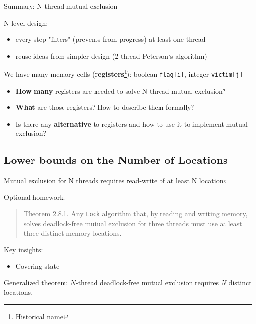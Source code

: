 \begin{frame}[fragile]{Summary: N-thread mutual exclusion}

N-level design:
\begin{itemize}
  \item every step "filters" (prevents from progress) at least one thread
  \item reuse ideas from simpler design (2-thread Peterson`s algorithm)
\end{itemize}

\pause

We have many memory cells (\textbf{registers}\footnote<2->{Historical name}): boolean \texttt{flag[i]}, integer \texttt{victim[j]}
\begin{itemize}
  \pause
  \item \textbf{How many} registers are needed to solve N-thread mutual exclusion? 
  
  \pause
  \item \textbf{What} are those registers? How to describe them formally? 
  
  \pause
  \item Is there any \textbf{alternative} to registers and how to use it to implement mutual exclusion? 
  
\end{itemize}

\end{frame}

\subsection{Lower bounds on the Number of Locations}
\showTOCSub

\begin{frame}{Mutual exclusion for N threads requires read-write of at least N locations}

Optional homework:
\begin{quote}
  Theorem 2.8.1. Any \texttt{Lock} algorithm that, by reading and writing memory, solves deadlock-free mutual exclusion for three threads must
  use at least three distinct memory locations.
\end{quote}

Key insights:
\begin{itemize}
  \item Covering state
\end{itemize}

Generalized theorem: $N$-thread deadlock-free mutual exclusion requires $N$ distinct locations.

\end{frame}


